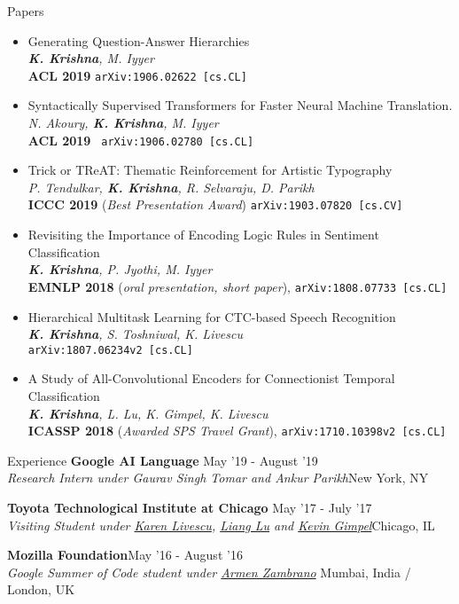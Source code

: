 \documentclass{resume} %
\begin{document}
\begin{rSection}{Papers}
\begin{itemize}[leftmargin=*]
\item Generating Question-Answer Hierarchies \\ \textit{\textbf{K. Krishna}, M. Iyyer} \\ \textbf{ACL 2019} \texttt{arXiv:1906.02622 [cs.CL]}
\item Syntactically Supervised Transformers for Faster Neural Machine Translation. \\ \textit{N. Akoury, \textbf{K. Krishna}, M. Iyyer} \\ \textbf{ACL 2019} \texttt{ 	arXiv:1906.02780 [cs.CL]}
\item Trick or TReAT: Thematic Reinforcement for Artistic Typography \\ \textit{P. Tendulkar, \textbf{K. Krishna}, R. Selvaraju, D. Parikh} \\ \textbf{ICCC 2019} (\textit{Best Presentation Award}) \texttt{arXiv:1903.07820 [cs.CV]} 
\item Revisiting the Importance of Encoding Logic Rules in Sentiment Classification \\ \textit{\textbf{K. Krishna}, P. Jyothi, M. Iyyer} \\ \textbf{EMNLP 2018} (\textit{oral presentation, short paper}), 
\texttt{arXiv:1808.07733 [cs.CL]}
\item Hierarchical Multitask Learning for CTC-based Speech Recognition  \\ \textit{\textbf{K. Krishna}, S. Toshniwal, K. Livescu} \\ \texttt{arXiv:1807.06234v2 [cs.CL]} 
\item A Study of All-Convolutional Encoders for Connectionist Temporal Classification\\ \textit{\textbf{K. Krishna}, L. Lu, K. Gimpel,  K. Livescu}\\ \textbf{ICASSP 2018} (\textit{Awarded SPS Travel Grant}), \texttt{arXiv:1710.10398v2 [cs.CL]} 
\end{itemize}
\end{rSection}
\vspace*{-1.5mm}
\begin{rSection}{Experience}
{\bf Google AI Language}{ \hfill May '19 - August '19}\\ \textit{Research Intern under Gaurav Singh Tomar and Ankur Parikh}{\hfill New York, NY}

{\bf Toyota Technological Institute at Chicago}{ \hfill May '17 - July '17}\\ \textit{Visiting Student under \href{http://ttic.uchicago.edu/~klivescu/}{Karen Livescu}, \href{http://ttic.uchicago.edu/~llu/}{Liang Lu} and \href{http://ttic.uchicago.edu/~kgimpel/}{Kevin Gimpel}}{\hfill Chicago, IL}

{\bf Mozilla Foundation}{\hfill May '16 - August '16} \\ \textit{Google Summer of Code student under \href{https://github.com/armenzg}{Armen Zambrano}}{ \hfill Mumbai, India / London, UK}
\end{rSection}
\end{document}

